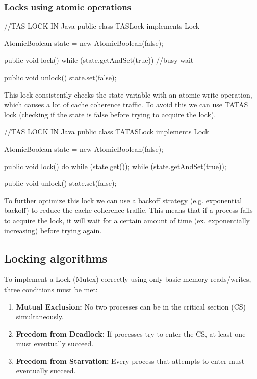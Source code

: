 \subsubsection{Locks using atomic operations}

\begin{codeexample}
//TAS LOCK IN Java
public class TASLock implements Lock {
    AtomicBoolean state = new AtomicBoolean(false);

    public void lock() {
        while (state.getAndSet(true)) {
            //busy wait
        }
    }

    public void unlock() {
        state.set(false);
    }
}
\end{codeexample}

\begin{remark}
    This lock consistently checks the state variable with an atomic write operation, which causes a lot of cache coherence traffic. To avoid this we can use TATAS lock (checking if the state is false before trying to acquire the lock).
\end{remark}

\begin{codeexample}
//TAS LOCK IN Java
public class TATASLock implements Lock {
    AtomicBoolean state = new AtomicBoolean(false);

    public void lock() {
        do {
            while (state.get());
        } while (state.getAndSet(true));
    }

    public void unlock() {
        state.set(false);
    }
}
\end{codeexample}

\begin{remark}
    To further optimize this lock we can use a backoff strategy (e.g. exponential backoff) to reduce the cache coherence traffic. This means that if a process fails to acquire the lock, it will wait for a certain amount of time (ex. exponentially increasing) before trying again.
\end{remark}

\subsection{Locking algorithms}

To implement a Lock (Mutex) correctly using only basic memory reads/writes, three conditions must be met:
\begin{enumerate}
    \item \textbf{Mutual Exclusion:} No two processes can be in the critical section (CS) simultaneously.
    \item \textbf{Freedom from Deadlock:} If processes try to enter the CS, at least one must eventually succeed.
    \item \textbf{Freedom from Starvation:} Every process that attempts to enter must eventually succeed.
\end{enumerate}

